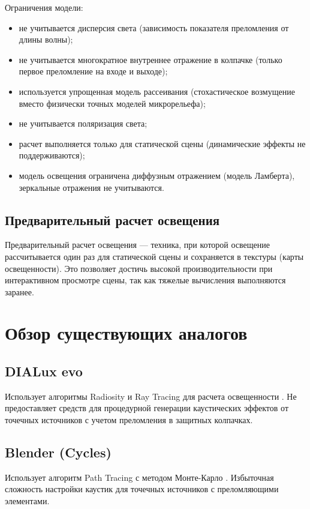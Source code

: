 Ограничения модели:
\begin{itemize}
    \item не учитывается дисперсия света (зависимость показателя преломления от длины волны);
    \item не учитывается многократное внутреннее отражение в колпачке (только первое преломление на входе и выходе);
    \item используется упрощенная модель рассеивания (стохастическое возмущение вместо физически точных моделей микрорельефа);
    \item не учитывается поляризация света;
    \item расчет выполняется только для статической сцены (динамические эффекты не поддерживаются);
    \item модель освещения ограничена диффузным отражением (модель Ламберта), зеркальные отражения не учитываются.
\end{itemize}

\subsection{Предварительный расчет освещения}

Предварительный расчет освещения --- техника, при которой освещение рассчитывается один раз для статической сцены и сохраняется в текстуры (карты освещенности). Это позволяет достичь высокой производительности при интерактивном просмотре сцены, так как тяжелые вычисления выполняются заранее.

\section{Обзор существующих аналогов}

\subsection{DIALux evo}

Использует алгоритмы Radiosity и Ray Tracing для расчета освещенности \cite{5}. Не предоставляет средств для процедурной генерации каустических эффектов от точечных источников с учетом преломления в защитных колпачках.

\subsection{Blender (Cycles)}

Использует алгоритм Path Tracing с методом Монте-Карло \cite{6,7}. Избыточная сложность настройки каустик для точечных источников с преломляющими элементами.

